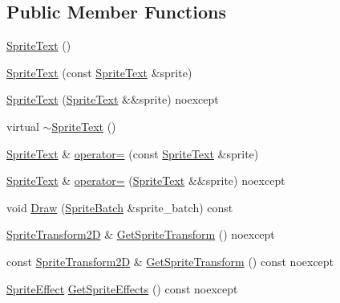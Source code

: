 \subsection*{Public Member Functions}
\begin{DoxyCompactItemize}
\item 
\mbox{\hyperlink{classmage_1_1rendering_1_1_sprite_text_aa250ee1527cbb9dba2f693df7cedd06f}{Sprite\+Text}} ()
\item 
\mbox{\hyperlink{classmage_1_1rendering_1_1_sprite_text_a60b40732c1a08b88b70335cf91947556}{Sprite\+Text}} (const \mbox{\hyperlink{classmage_1_1rendering_1_1_sprite_text}{Sprite\+Text}} \&sprite)
\item 
\mbox{\hyperlink{classmage_1_1rendering_1_1_sprite_text_ad2bdddde8371d59c85449a9979017f8c}{Sprite\+Text}} (\mbox{\hyperlink{classmage_1_1rendering_1_1_sprite_text}{Sprite\+Text}} \&\&sprite) noexcept
\item 
virtual \mbox{\hyperlink{classmage_1_1rendering_1_1_sprite_text_a6ce8013356e64827767178e01cc2737c}{$\sim$\+Sprite\+Text}} ()
\item 
\mbox{\hyperlink{classmage_1_1rendering_1_1_sprite_text}{Sprite\+Text}} \& \mbox{\hyperlink{classmage_1_1rendering_1_1_sprite_text_a50d21c24a019c0e8dc053a307ec421a6}{operator=}} (const \mbox{\hyperlink{classmage_1_1rendering_1_1_sprite_text}{Sprite\+Text}} \&sprite)
\item 
\mbox{\hyperlink{classmage_1_1rendering_1_1_sprite_text}{Sprite\+Text}} \& \mbox{\hyperlink{classmage_1_1rendering_1_1_sprite_text_a8ced44509f1fa84236b20f1d42add873}{operator=}} (\mbox{\hyperlink{classmage_1_1rendering_1_1_sprite_text}{Sprite\+Text}} \&\&sprite) noexcept
\item 
void \mbox{\hyperlink{classmage_1_1rendering_1_1_sprite_text_afbe374756e97dcec4fcf83f76a0c233b}{Draw}} (\mbox{\hyperlink{classmage_1_1rendering_1_1_sprite_batch}{Sprite\+Batch}} \&sprite\+\_\+batch) const
\item 
\mbox{\hyperlink{classmage_1_1_sprite_transform2_d}{Sprite\+Transform2D}} \& \mbox{\hyperlink{classmage_1_1rendering_1_1_sprite_text_ab137a046c56306d06741491d459dd1a2}{Get\+Sprite\+Transform}} () noexcept
\item 
const \mbox{\hyperlink{classmage_1_1_sprite_transform2_d}{Sprite\+Transform2D}} \& \mbox{\hyperlink{classmage_1_1rendering_1_1_sprite_text_a6db14770931fa027175333cbf7761327}{Get\+Sprite\+Transform}} () const noexcept
\item 
\mbox{\hyperlink{namespacemage_1_1rendering_a4dbc3536c87b906f1d41d863ec458e78}{Sprite\+Effect}} \mbox{\hyperlink{classmage_1_1rendering_1_1_sprite_text_ad9a7ac6ba55ae87a1849b3f1e8e6892b}{Get\+Sprite\+Effects}} () const noexcept

\end{DoxyCompactItemize}
